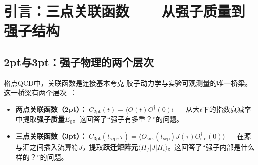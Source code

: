 \documentclass[12pt,a4paper]{ctexart}
\theoremstyle{definition}
\begin{document}
\begin{abstract}
\textbf{第五维度——矩阵元提取（§6）：}
系统阐述从裸三点关联函数到物理矩阵元的提取流程：(i) \textbf{比值法}——$R = C_{3\text{pt}} / C_{2\text{pt}}$ 消除重叠因子和指数衰减；(ii) \textbf{R̃方法}——通过相邻$t_{\text{sep}}$的差分加速平台到达；(iii) \textbf{双态拟合}——用解析形式 $R \approx c_0 + c_1 e^{-\Delta E(t_{\text{sep}}-t)} + c_1 e^{-\Delta E t}$ 拟合以分离跃迁项污染。

\textbf{第六维度——激发态污染的系统控制（§7）：}
详述三类策略：(i) \textbf{多态拟合}——系统比较two-simRR、two-sim等拟合方案对$t_{\text{sep}}^{\min}$和$n_{\text{ex}}$的敏感性；(ii) \textbf{求和法}——通过对插入时间$t$求和消除$O(e^{-\Delta E t_{\text{sep}}})$的激发态贡献；(iii) \textbf{GEVP变分法}——通过求解$C(t)v = \lambda(t)C(t_0)v$从扩展算符基中分离近似独立的能级。

\textbf{第七维度——代码实现与本库中的实战（§8）：}
展示\texttt{examples/zhangxin/gluon\_pdf\_workflow.py}和\texttt{snsc/main.py}中三点函数构造的实际代码——从VVV张量构造、perambulator收缩、到OPE非连通三点函数的系综关联和bootstrap/jackknife误差传播。
\end{abstract}

\tableofcontents
\newpage

\section{引言：三点关联函数——从强子质量到强子结构}

\subsection{2pt与3pt：强子物理的两个层次}

格点QCD中，关联函数是连接基本夸克-胶子动力学与实验可观测量的唯一桥梁。这一桥梁有两个层次~\cite{GattringerLang2010}：

\begin{itemize}[leftmargin=*]
    \item \textbf{两点关联函数（2pt）：} $C_{2\text{pt}}(t) = \langle O(t) O^\dagger(0) \rangle$ — 从大$t$下的指数衰减率中提取\textbf{强子质量}$E_0$。这回答了``强子有多重？''的问题。
    \item \textbf{三点关联函数（3pt）：} $C_{3\text{pt}}(t_{\text{sep}}, \tau) = \langle O_{\text{snk}}(t_{\text{sep}}) J(\tau) O_{\text{src}}^\dagger(0) \rangle$ — 在源与汇之间插入流算符$J$，提取\textbf{跃迁矩阵元}$\langle H_f|J|H_i\rangle$。这回答了``强子内部是什么样的？''的问题。
\end{itemize}
\end{document}
